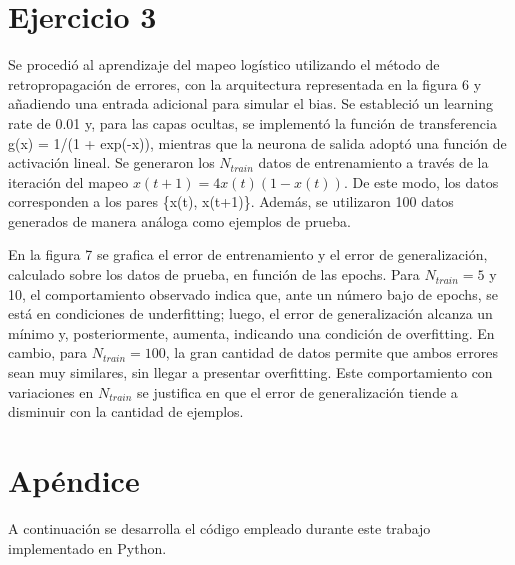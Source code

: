 \documentclass[aps,prb,twocolumn,superscriptaddress,floatfix,longbibliography]{revtex4-2}
\newcounter{para}
\begin{document}
\section*{Ejercicio 3}

Se procedió al aprendizaje del mapeo logístico utilizando el método de retropropagación de errores, con la arquitectura representada en la figura 6 y añadiendo una entrada adicional para simular el bias. Se estableció un learning rate de 0.01 y, para las capas ocultas, se implementó la función de transferencia g(x) = 1/(1 + exp(-x)), mientras que la neurona de salida adoptó una función de activación lineal. Se generaron los \(N_{train}\) datos de entrenamiento a través de la iteración del mapeo \(x(t + 1) = 4x(t)(1-x(t))\). De este modo, los datos corresponden a los pares \{x(t), x(t+1)\}. Además, se utilizaron 100 datos generados de manera análoga como ejemplos de prueba.

En la figura 7 se grafica el error de entrenamiento y el error de generalización, calculado sobre los datos de prueba, en función de las epochs. Para \(N_{train} = 5\) y 10, el comportamiento observado indica que, ante un número bajo de epochs, se está en condiciones de underfitting; luego, el error de generalización alcanza un mínimo y, posteriormente, aumenta, indicando una condición de overfitting. En cambio, para \(N_{train} = 100\), la gran cantidad de datos permite que ambos errores sean muy similares, sin llegar a presentar overfitting. Este comportamiento con variaciones en \(N_{train}\) se justifica en que el error de generalización tiende a disminuir con la cantidad de ejemplos.



\onecolumngrid

\section*{Apéndice}
A continuación se desarrolla el código empleado durante este trabajo implementado en Python.
\end{document}
